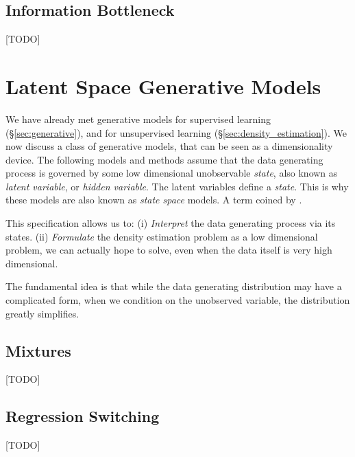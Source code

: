 \subsection{Information Bottleneck}
[TODO]


\begin{remark}
\end{remark}








\section{Latent Space Generative Models}
\label{sec:latent_space}

We have already met generative models for supervised learning (\S\ref{sec:generative}), and for unsupervised learning (\S\ref{sec:density_estimation}).
We now discuss a class of generative models, that can be seen as a dimensionality device. 
The following models and methods assume that the data generating process is governed by some low dimensional unobservable \emph{state}, also known as \emph{latent variable}, or \emph{hidden variable}.
The latent variables define a \emph{state}. This is why these models are also known as \emph{state space} models. A term coined by \citet{kalman_contributions_1960}.

This specification allows us to:
(i) \emph{Interpret} the data generating process via its states. 
(ii) \emph{Formulate} the density estimation problem as a low dimensional problem, we can actually hope to solve, even when the data itself is very high dimensional.

The fundamental idea is that while the data generating distribution may have a complicated form, when we condition on the unobserved variable, the distribution greatly simplifies. 


\subsection{Mixtures}
[TODO]


\subsection{Regression Switching}
[TODO]




